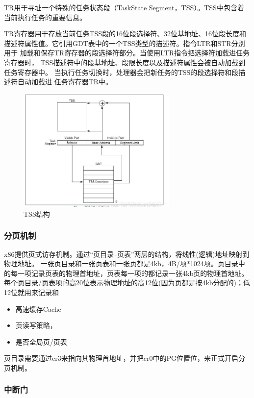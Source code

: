 \documentclass[12pt,a4paper,UTF8]{ctexart}
\begin{document}
TR用于寻址一个特殊的任务状态段（TaskState Segment，TSS）。TSS中包含着
当前执行任务的重要信息。

TR寄存器用于存放当前任务TSS段的16位段选择符、32位基地址、16位段长度和
描述符属性值。它引用GDT表中的一个TSS类型的描述符。指令LTR和STR分别用于
加载和保存TR寄存器的段选择符部分。当使用LTR指令把选择符加载进任务寄存器时，
TSS描述符中的段基地址、段限长度以及描述符属性会被自动加载到任务寄存器中。
当执行任务切换时，处理器会把新任务的TSS的段选择符和段描述符自动加载进
任务寄存器TR中。

\begin{figure}[htbp]
\centering
\includegraphics[width=0.7\textwidth]{figs/TSS.png}
\caption{TSS结构}
\label{fig:TSS}
\end{figure}

\subsubsection*{分页机制}

x86提供页式访存机制。通过“页目录--页表”两层的结构，将线性(逻辑)地址映射到物理地址。
一张页目录和一张页表和一张页都是4kb，4B/项*1024项。页目录中的每一项记录页表的物理首地址，页表每一项的都记录一张4kb页的物理首地址。
每个页目录/页表项的高20位表示物理地址的高12位(因为页都是按4kb分配的)；低12位就用来记录和

\begin{itemize}
\item 高速缓存Cache
\item 页读写策略，
\item 是否全局页/页表
\end{itemize}

页目录需要通过cr3来指向其物理首地址，并把cr0中的PG位置位，来正式开启分页机制。

\subsubsection*{中断门}
\end{document}

